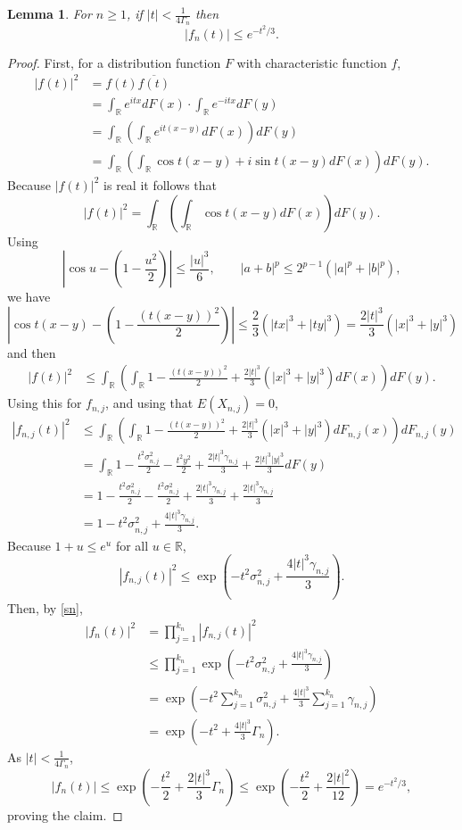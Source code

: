 \documentclass{article}
\newtheorem{lemma}[theorem]{Lemma}
\theoremstyle{definition}
\begin{document}
\begin{lemma}
For $n \geq 1$, if $|t|<\frac{1}{4\Gamma_n}$ then
\[
|f_n(t)| \leq e^{-t^2/3}.
\] 
\label{Gamma2}
\end{lemma}
\begin{proof}
First, for a distribution function $F$ with characteristic function $f$,
\begin{align*}
|f(t)|^2 &= f(t) \overline{f(t)}\\
&= \int_\mathbb{R} e^{itx} dF(x) \cdot \int_\mathbb{R} e^{-itx} dF(y)\\
&=\int_\mathbb{R}\left( \int_\mathbb{R} e^{it(x-y)} dF(x) \right) dF(y)\\
&=\int_\mathbb{R}\left( \int_\mathbb{R} \cos t(x-y)+i\sin t(x-y) dF(x) \right) dF(y).
\end{align*}
Because $|f(t)|^2$ is real it follows that
\[
|f(t)|^2 = \int_\mathbb{R}\left( \int_\mathbb{R} \cos t(x-y) dF(x) \right) dF(y).
\]
Using
\[
\left| \cos u - \left(1 - \frac{u^2}{2}\right) \right| \leq \frac{|u|^3}{6},\qquad
|a+b|^p \leq 2^{p-1}(|a|^p+|b|^p), 
\]
we have
\[
\left| \cos t(x-y) -\left(1-\frac{(t(x-y))^2}{2} \right)\right| \leq \frac{2}{3}\left(|tx|^3+|ty|^3\right)
=\frac{2|t|^3}{3}(|x|^3+|y|^3)
\]
and then
\begin{align*}
|f(t)|^2&\leq \int_\mathbb{R} \left( \int_\mathbb{R} 1-\frac{(t(x-y))^2}{2}  
+ \frac{2|t|^3}{3}(|x|^3+|y|^3) dF(x) \right) dF(y).
\end{align*}
Using this for $f_{n,j}$, and using that $E(X_{n,j})=0$,
\begin{align*}
|f_{n,j}(t)|^2&\leq  \int_\mathbb{R} \left( \int_\mathbb{R} 1-\frac{(t(x-y))^2}{2}  
+\frac{2|t|^3}{3}(|x|^3+|y|^3) dF_{n,j}(x) \right) dF_{n,j}(y)\\
&=\int_{\mathbb{R}} 1-\frac{t^2 \sigma_{n,j}^2}{2}- \frac{t^2 y^2}{2} + \frac{2|t|^3 \gamma_{n,j}}{3}
+\frac{2|t|^3 |y|^3}{3} dF(y)\\
&=1-\frac{t^2 \sigma_{n,j}^2}{2} - \frac{t^2 \sigma_{n,j}^2}{2} + \frac{2|t|^3 \gamma_{n,j}}{3} + \frac{2|t|^3 \gamma_{n,j}}{3}\\
&=1-t^2 \sigma_{n,j}^2 + \frac{4 |t|^3 \gamma_{n,j}}{3}.
\end{align*}
Because $1+u \leq e^u$ for all $u \in \mathbb{R}$,
\[
|f_{n,j}(t)|^2 \leq \exp\left(-t^2 \sigma_{n,j}^2 + \frac{4 |t|^3 \gamma_{n,j}}{3}\right).
\]
Then, by \eqref{sn},
\begin{align*}
|f_n(t)|^2&=\prod_{j=1}^{k_n} |f_{n,j}(t)|^2\\
&\leq \prod_{j=1}^{k_n}  \exp\left(-t^2 \sigma_{n,j}^2 + \frac{4 |t|^3 \gamma_{n,j}}{3}\right)\\
&=\exp\left(-t^2 \sum_{j=1}^{k_n} \sigma_{n,j}^2 + \frac{4|t|^3}{3} \sum_{j=1}^{k_n} \gamma_{n,j} \right)\\
&=\exp\left(-t^2 + \frac{4|t|^3}{3} \Gamma_n \right).
\end{align*}
As $|t| < \frac{1}{4\Gamma_n}$,
\[
|f_n(t)| \leq \exp\left(-\frac{t^2}{2} + \frac{2|t|^3}{3} \Gamma_n \right)
\leq \exp\left(-\frac{t^2}{2} + \frac{2|t|^2}{12}\right)
=e^{-t^2/3},
\]
proving the claim.
\end{proof}
\end{document}
